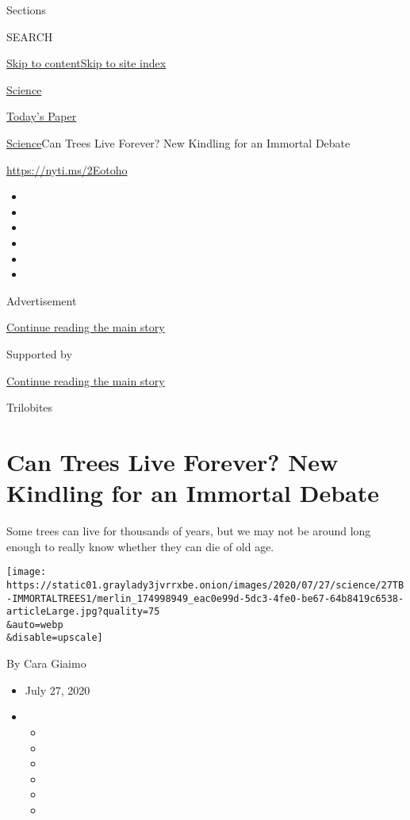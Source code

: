 Sections

SEARCH

\protect\hyperlink{site-content}{Skip to
content}\protect\hyperlink{site-index}{Skip to site index}

\href{https://www.nytimes3xbfgragh.onion/section/science}{Science}

\href{https://myaccount.nytimes3xbfgragh.onion/auth/login?response_type=cookie\&client_id=vi}{}

\href{https://www.nytimes3xbfgragh.onion/section/todayspaper}{Today's
Paper}

\href{/section/science}{Science}\textbar{}Can Trees Live Forever? New
Kindling for an Immortal Debate

\url{https://nyti.ms/2Eotoho}

\begin{itemize}
\item
\item
\item
\item
\item
\item
\end{itemize}

Advertisement

\protect\hyperlink{after-top}{Continue reading the main story}

Supported by

\protect\hyperlink{after-sponsor}{Continue reading the main story}

Trilobites

\hypertarget{can-trees-live-forever-new-kindling-for-an-immortal-debate}{%
\section{Can Trees Live Forever? New Kindling for an Immortal
Debate}\label{can-trees-live-forever-new-kindling-for-an-immortal-debate}}

Some trees can live for thousands of years, but we may not be around
long enough to really know whether they can die of old age.

\texttt{[image: https://static01.graylady3jvrrxbe.onion/images/2020/07/27/science/27TB-IMMORTALTREES1/merlin\_174998949\_eac0e99d-5dc3-4fe0-be67-64b8419c6538-articleLarge.jpg?quality=75\\\&auto=webp\\\&disable=upscale]}

By Cara Giaimo

\begin{itemize}
\item
  July 27, 2020
\item
  \begin{itemize}
  \item
  \item
  \item
  \item
  \item
  \item
  \end{itemize}
\end{itemize}

